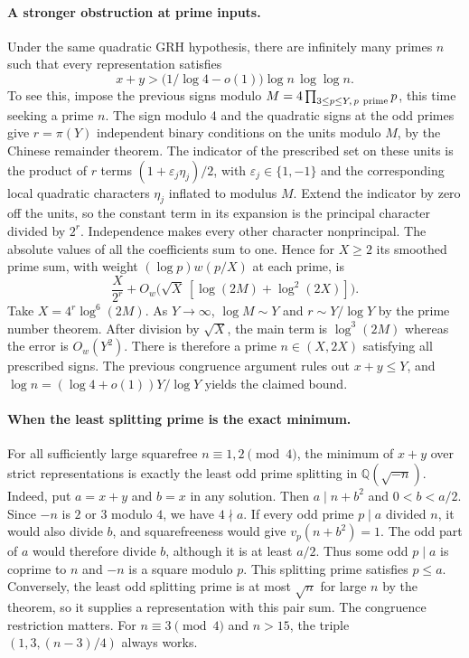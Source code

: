 \documentclass[11pt]{article}
\begin{document}
\paragraph{A stronger obstruction at prime inputs.}
Under the same quadratic GRH hypothesis, there are infinitely many primes $n$
such that every representation satisfies
\[
          x+y > \bigl(1/\log 4-o(1)\bigr)\log n\,\log\log n.
\]
To see this, impose the previous signs modulo
$M=4\prod_{3\le p\le Y,\,p\ {\rm prime}}p$, this time seeking a prime $n$.
The sign modulo 4 and the quadratic signs at the odd primes give
$r=\pi(Y)$ independent binary conditions on the units modulo $M$, by the
Chinese remainder theorem. The indicator of the prescribed set on these units
is the product of $r$ terms $(1+\varepsilon_j\eta_j)/2$, with
$\varepsilon_j\in\{1,-1\}$ and the corresponding local quadratic characters
$\eta_j$ inflated to modulus $M$. Extend the indicator by zero off the units,
so the constant term in its expansion is the principal character divided by
$2^r$. Independence makes every other character nonprincipal. The absolute
values of all the coefficients sum to one. Hence for $X\ge2$ its smoothed
prime sum, with weight $(\log p)w(p/X)$ at each prime, is
\[
    \frac{X}{2^r}+O_w\bigl(\sqrt X\,[\log(2M)+\log^2(2X)]\bigr).
\]
Take $X=4^r\log^6(2M)$. As $Y\to\infty$, $\log M\sim Y$ and
$r\sim Y/\log Y$ by the prime number theorem. After division by $\sqrt X$,
the main term is $\log^3(2M)$ whereas the error is $O_w(Y^2)$.
There is therefore a prime $n\in(X,2X)$ satisfying all prescribed signs.
The previous congruence argument rules out $x+y\le Y$, and
$\log n=(\log 4+o(1))Y/\log Y$ yields the claimed bound.
\paragraph{When the least splitting prime is the exact minimum.}
For all sufficiently large squarefree $n\equiv1,2\pmod4$, the minimum
of $x+y$ over strict representations is exactly the least odd prime splitting
in $\mathbb Q(\sqrt{-n})$. Indeed, put $a=x+y$ and $b=x$ in any solution.
Then $a\mid n+b^2$ and $0<b<a/2$. Since $-n$ is $2$ or $3$ modulo $4$,
we have $4\nmid a$. If every odd prime $p\mid a$ divided $n$, it would also
divide $b$, and squarefreeness would give $v_p(n+b^2)=1$. The odd part of $a$
would therefore divide $b$, although it is at least $a/2$. Thus some odd
$p\mid a$ is coprime to $n$ and $-n$ is a square modulo $p$. This splitting
prime satisfies $p\le a$. Conversely, the least odd splitting prime is at most
$\sqrt n$ for large $n$ by the theorem, so it supplies a representation with
this pair sum. The congruence restriction matters. For $n\equiv3\pmod4$ and
$n>15$, the triple $(1,3,(n-3)/4)$ always works.
\end{document}
